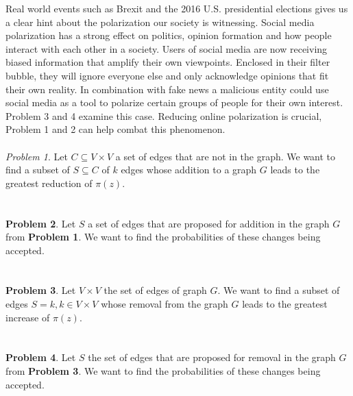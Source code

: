 Real world events such as Brexit and the 2016 U.S. presidential elections gives us a clear hint about the polarization our society is witnessing. Social media polarization has a strong effect on politics, opinion formation and how people interact with each other in a society. Users of social media are now receiving biased information that amplify their own viewpoints. Enclosed in their filter bubble, they will ignore everyone else and only acknowledge opinions that fit their own reality. In combination with fake news a malicious entity could use social media as a tool to polarize certain groups of people for their own interest. Problem 3 and 4 examine this case. Reducing online polarization is crucial, Problem 1 and 2 can help combat this phenomenon.
\\
\\
\textit{Problem 1}. Let $C \subseteq	V \times V$ a set of edges that are not in the graph. We want to find a subset of $S \subseteq C$ of $k$ edges whose addition to a graph $G$ leads to the greatest reduction of $\pi(z)$.
\\
\\
\\
\textbf{Problem 2}. Let $S$ a set of edges that are proposed for addition in the graph $G$ from \textbf{Problem 1}. We want to find the probabilities of these changes being accepted.
\\
\\
\\
\textbf{Problem 3}. Let $V \times V$ the set of edges of graph $G$. We want to find a subset of edges $S = k, k \in V \times V$   whose removal from the graph $G$ leads to the greatest increase of $\pi(z)$.
\\
\\
\\
\textbf{Problem 4}. Let $S$ the set of edges that are proposed for removal in the graph $G$ from \textbf{Problem 3}. We want to find the probabilities of these changes being accepted.
\\

